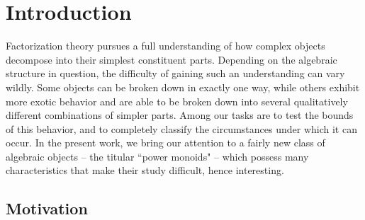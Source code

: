 \chapter{Introduction} \label{ch:intro}

Factorization theory pursues a full understanding of how complex objects decompose into their simplest constituent parts.  
Depending on the algebraic structure in question, the difficulty of gaining such an understanding can vary wildly. 
Some objects can be broken down in exactly one way, while others exhibit more exotic behavior and are able to be broken down into several qualitatively different combinations of simpler parts.
Among our tasks are to test the bounds of this behavior, and to completely classify the circumstances under which it can occur.
In the present work, we bring our attention to a fairly new class of algebraic objects -- the titular ``power monoids" --  which possess many characteristics that make their study difficult, hence interesting.

\section{Motivation}




